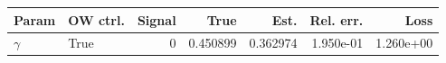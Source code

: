 \begin{tabular}{llrrrrr}
\hline
Param & OW ctrl. & Signal & True & Est. & Rel. err. & Loss \\
\hline
$\gamma$ & True & 0 & 0.450899 & 0.362974 & 1.950e-01 & 1.260e+00 \\
\hline
\end{tabular}
